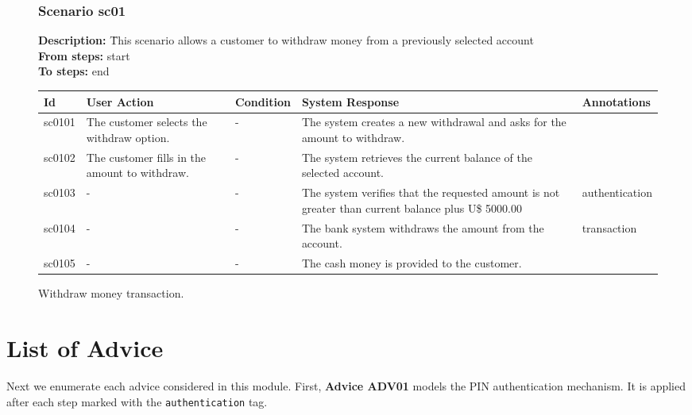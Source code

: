 \documentclass{article}
\begin{document}
\begin{figure}

\subsubsection*{Scenario sc01} \begin{tabbing} {\bf Description:} \= This scenario allows a customer to withdraw money from a previously selected account \\ {\bf From steps:} \> start \\ {\bf To steps:} \> end \\ \end{tabbing} \begin{tabular}{|p{0.4in}|p{1.2in}|p{1.2in}|p{1.2in}|p{1.2in}|} \hline Id & User Action & Condition & System Response & Annotations \\ \hline sc0101 & The customer selects the withdraw option. & - & The system creates a new withdrawal and asks for the amount to withdraw. & \\ \hline sc0102 & The customer fills in the amount to withdraw. & - & The system retrieves the current balance of the selected account. & \\ \hline sc0103 & - & - & The system verifies that the requested amount is not greater than current balance plus U\$ 5000.00 & authentication \\ \hline sc0104 & - & - & The bank system withdraws the amount from the account. & transaction \\ \hline sc0105 & - & - & The cash money is provided to the customer. & \\ \hline \end{tabular}
\caption{Withdraw money transaction.}
\label{fig:sc01}
\end{figure}

\newpage

\section{List of Advice}

Next we enumerate each advice considered in this module. First, 
{\bf Advice ADV01} models the PIN authentication mechanism. It is applied 
after each step marked with the \texttt{authentication} tag.
\end{document}
